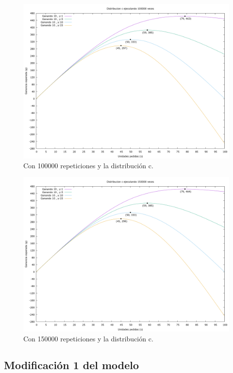 \documentclass[12pt, spanish]{article}
\begin{document}
\begin{figure}[H]
	\centering
	\includegraphics[scale = 0.3]{prob_c/datos_c_100000.png}
	\caption{Con 100000 repeticiones y la distribución c.}
	\label{fig:ej1_a_100000}

\end{figure}

\begin{figure}[H]
	\centering
	\includegraphics[scale = 0.3]{prob_c/datos_c_150000.png}
	\caption{Con 150000 repeticiones y la distribución c.}
	\label{fig:ej1_a_150000}

\end{figure}


\subsection{Modificación 1 del modelo}
\end{document}

